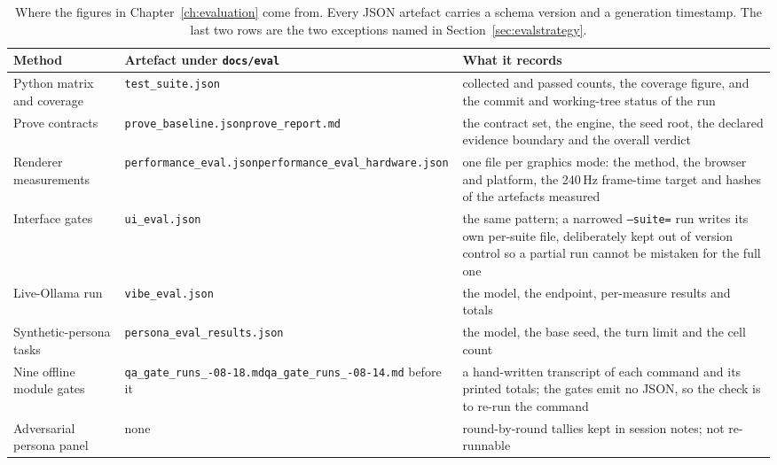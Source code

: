 \documentclass[11pt,a4paper]{report}
\begin{document}
\begin{table}[h]
\centering\small
\renewcommand{\arraystretch}{1.15}
\begin{tabular}{@{}p{2.8cm}p{4.9cm}p{7.2cm}@{}}
\toprule
Method & Artefact under \texttt{docs/eval} & What it records \\
\midrule
Python matrix and coverage & \texttt{test\_suite.json} & collected and passed counts, the coverage figure, and the commit and working-tree status of the run \\
Prove contracts & \texttt{prove\_baseline.json}\newline \texttt{prove\_report.md} & the contract set, the engine, the seed root, the declared evidence boundary and the overall verdict \\
Renderer measurements & \texttt{performance\_eval.json}\newline \texttt{performance\_eval\_\allowbreak hardware.json} & one file per graphics mode: the method, the browser and platform, the 240\,Hz frame-time target and hashes of the artefacts measured \\
Interface gates & \texttt{ui\_eval.json} & the same pattern; a narrowed \texttt{--suite=} run writes its own per-suite file, deliberately kept out of version control so a partial run cannot be mistaken for the full one \\
Live-Ollama run & \texttt{vibe\_eval.json} & the model, the endpoint, per-measure results and totals \\
Synthetic-persona tasks & \texttt{persona\_eval\_\allowbreak results.json} & the model, the base seed, the turn limit and the cell count \\
Nine offline module gates & \texttt{qa\_gate\_runs\_\allowbreak 2026-08-18.md}\newline \texttt{qa\_gate\_runs\_\allowbreak 2026-08-14.md} before it & a hand-written transcript of each command and its printed totals; the gates emit no JSON, so the check is to re-run the command \\
Adversarial persona panel & none & round-by-round tallies kept in session notes; not re-runnable \\
\bottomrule
\end{tabular}
\caption{Where the figures in Chapter~\ref{ch:evaluation} come from. Every JSON artefact carries a schema version and a generation timestamp. The last two rows are the two exceptions named in Section~\ref{sec:evalstrategy}.}
\label{tab:provenance}
\end{table}
\end{document}

